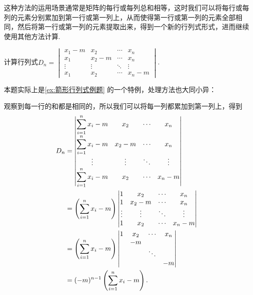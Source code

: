 这种方法的运用场景通常是矩阵的每行或每列总和相等，这时我们可以将每行或每列的元素分别累加到第一行或第一列上，从而使得第一行或第一列的元素全部相同，然后将第一行或第一列的元素提取出来，得到一个新的行列式形式，进而继续使用其他方法计算.

\begin{example}{}{}
    计算行列式$D_n=\begin{vmatrix}
            x_1-m  & x_2    & \cdots & x_n    \\
            x_1    & x_2-m  & \cdots & x_n    \\
            \vdots & \vdots & \ddots & \vdots \\
            x_1    & x_2    & \cdots & x_n-m
        \end{vmatrix}$.
\end{example}

本题实际上是\autoref{ex:箭形行列式例题} 的一个特例，处理方法也大同小异：

\begin{solution}
    观察到每一行的和都是相同的，所以我们可以将每一列都累加到第一列上，得到
    \begin{align*}
        D_n & =\begin{vmatrix}
                   \displaystyle\sum_{i=1}^{n}\limits x_i-m & x_2    & \cdots & x_n    \\
                   \displaystyle\sum_{i=1}^{n}\limits x_i-m & x_2-m  & \cdots & x_n    \\
                   \vdots                            & \vdots & \ddots & \vdots \\
                   \displaystyle\sum_{i=1}^{n}\limits x_i-m & x_2    & \cdots & x_n-m
               \end{vmatrix} \\
            & =\left(\sum_{i=1}^{n}\limits x_i-m\right)
        \begin{vmatrix}
            1      & x_2    & \cdots & x_n    \\
            1      & x_2-m  & \cdots & x_n    \\
            \vdots & \vdots & \ddots & \vdots \\
            1      & x_2    & \cdots & x_n-m
        \end{vmatrix}                                   \\
            & =\left(\sum_{i=1}^{n}\limits x_i-m\right)
        \begin{vmatrix}
            1 & x_2 & \cdots & x_n \\
              & -m  &        &     \\
              &     & \ddots &     \\
              &     &        & -m
        \end{vmatrix}                                              \\
            & =(-m)^{n-1}\left(\sum_{i=1}^{n}\limits x_i-m\right).
    \end{align*}
\end{solution}

